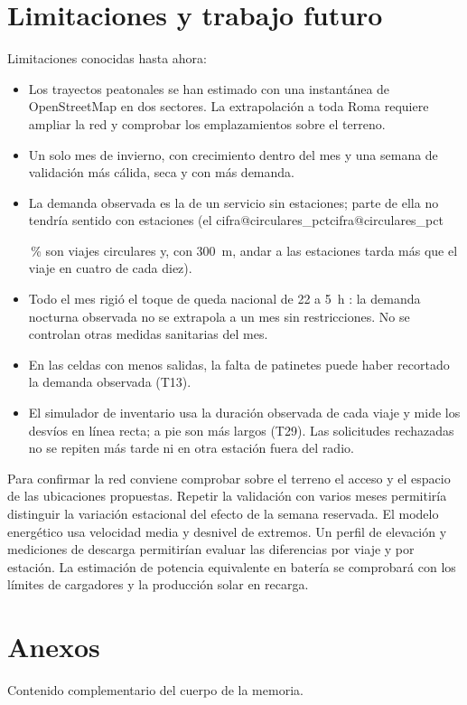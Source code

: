 \documentclass[11pt,a4paper]{article}
\makeatletter
\newcommand\cifra[1]{\ifcsname cifra@#1\endcsname\csname cifra@#1\endcsname
  \else\PackageError{memoria}{Cifra desconocida: \detokenize{#1}}{Revisa generar_cifras.py}\fi}
\newcommand\pc{\,\%}
\makeatother
\begin{document}
\section{Limitaciones y trabajo futuro}
Limitaciones conocidas hasta ahora:
\begin{itemize}
  \item Los trayectos peatonales se han estimado con una instantánea de OpenStreetMap
        en dos sectores. La extrapolación a toda Roma requiere ampliar la red y
        comprobar los emplazamientos sobre el terreno.
  \item Un solo mes de invierno, con crecimiento dentro del mes y una semana de validación más
        cálida, seca y con más demanda.
  \item La demanda observada es la de un servicio sin estaciones; parte de ella no tendría
        sentido con estaciones (el \cifra{circulares_pct}\pc{} son viajes circulares y, con
        300~m, andar a las estaciones tarda más que el viaje en cuatro de cada diez).
  \item Todo el mes rigió el toque de queda nacional de 22 a 5~h \cite{dpcm2021}: la demanda
        nocturna observada no se extrapola a un mes sin restricciones. No se controlan otras
        medidas sanitarias del mes.
  \item En las celdas con menos salidas, la falta de patinetes puede haber recortado la
        demanda observada (T13).
  \item El simulador de inventario usa la duración observada de cada viaje y mide los desvíos
        en línea recta; a pie son más largos (T29). Las solicitudes rechazadas no se repiten
        más tarde ni en otra estación fuera del radio.
\end{itemize}
Para confirmar la red conviene comprobar sobre el terreno el acceso y el
espacio de las ubicaciones propuestas. Repetir la validación con varios meses
permitiría distinguir la variación estacional del efecto de la semana reservada.
El modelo energético usa velocidad media y desnivel de extremos. Un perfil
de elevación y mediciones de descarga permitirían evaluar las diferencias por
viaje y por estación. La estimación de potencia equivalente en batería se
comprobará con los límites de cargadores y la producción solar en recarga.

\printbibliography[heading=bibintoc,title={Referencias}]

\clearpage
\appendix
\section*{Anexos}
Contenido complementario del cuerpo de la memoria.
\end{document}
